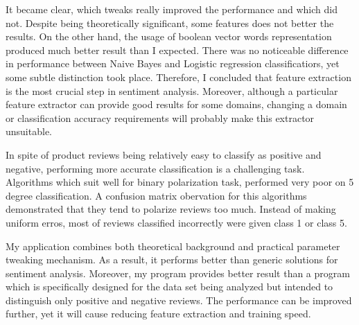 \documentclass[12pt]{report}
\begin{document}
It became clear, which tweaks really improved the performance and which did not. Despite being theoretically significant, some features does not better the results. On the other hand, the usage of boolean vector words representation produced much better result than I expected. There was no noticeable difference in performance between Naive Bayes and Logistic regression classificatiors, yet some subtle distinction took place. Therefore, I concluded that feature extraction is the most crucial step in sentiment analysis. Moreover, although a particular feature extractor can provide good results for some domains, changing a domain or classification accuracy requirements will probably make this extractor unsuitable. 

In spite of product reviews being relatively easy to classify as positive and negative, performing more accurate classification is a challenging task. Algorithms which suit well for binary polarization task, performed very poor on 5 degree classification. A confusion matrix obervation for this algorithms demonstrated that they tend to polarize reviews too much. Instead of making uniform erros, most of reviews classified incorrectly were given class 1 or class 5.

My application combines both theoretical background and practical parameter tweaking mechanism. As a result, it performs better than generic solutions for sentiment analysis. Moreover, my program provides better result than a program which is specifically designed for the data set being analyzed but intended to distinguish only positive and negative reviews. The performance can be improved further, yet it will cause reducing feature extraction and training speed.

\newpage

\end{document}
